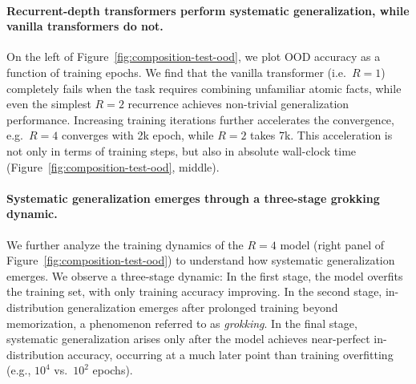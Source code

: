 \documentclass{article} %
\newcommand{\yy}[1]{\textcolor{blue}{[Yuekun: #1]}}
\begin{document}
\paragraph{Recurrent-depth transformers perform systematic generalization, while vanilla transformers do not.}
On the left of Figure~\ref{fig:composition-test-ood}, we plot OOD accuracy as a function of training epochs.
We find that the vanilla transformer (i.e.\ $R=1$) completely fails when the task requires combining unfamiliar atomic facts, while even the simplest $R=2$ recurrence achieves non-trivial generalization performance.
Increasing training iterations further accelerates the convergence, e.g.\, $R=4$ converges with 2k epoch, while $R=2$ takes 7k. This acceleration is not only in terms of training steps, but also in absolute wall-clock time (Figure~\ref{fig:composition-test-ood}, middle).

\paragraph{Systematic generalization emerges through a three-stage grokking dynamic.}
We further analyze the training dynamics of the $R=4$ model (right panel of Figure~\ref{fig:composition-test-ood}) to understand how systematic generalization emerges.
We observe a three-stage dynamic:
In the first stage, the model overfits the training set, with only training accuracy improving.
In the second stage, in-distribution generalization emerges after prolonged training beyond memorization, a phenomenon referred to as \textit{grokking}.
In the final stage, systematic generalization arises only after the model achieves near-perfect in-distribution accuracy, occurring at a much later point than training overfitting (e.g., $10^4$ vs.\ $10^2$ epochs).
\end{document}
